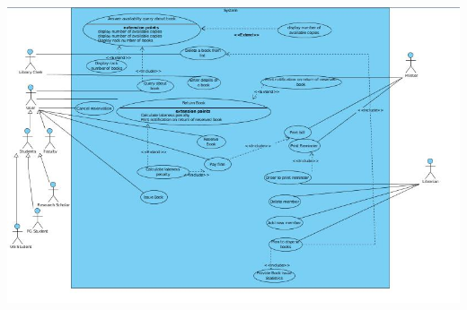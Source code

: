 \documentclass{article}
\begin{document}
\includegraphics[scale=0.55]{images/useCaseDiag.jpg}\\
\end{document}
